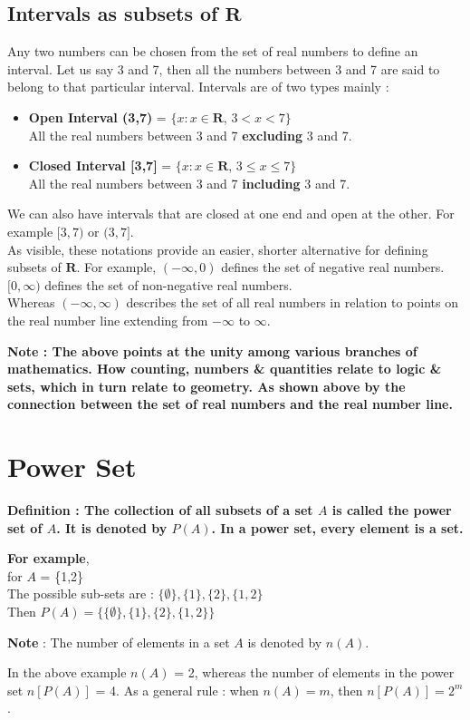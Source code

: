 \documentclass[12pt, letterpaper]{article}
\begin{document}
\subsection{Intervals as subsets of $\mathbf{R}$}
Any two numbers can be chosen from the set of real numbers to define an interval. Let us say 3 and 7, then all the numbers between 3 and 7 are said to belong to that particular interval. Intervals are of two types mainly : 
\begin{itemize}
    \item \textbf{Open Interval (3,7)} = $\{ x : x \in \mathbf{R}$, $3 < x < 7 \}$ \\
    All the real numbers between 3 and 7 \textbf{excluding} 3 and 7.
    \item \textbf{Closed Interval [3,7]} = $\{ x : x \in \mathbf{R}$, $3 \leq x \leq 7 \}$ \\
    All the real numbers between 3 and 7 \textbf{including} 3 and 7.
\end{itemize}
We can also have intervals that are closed at one end and open at the other. For example $[3,7)$ or $(3,7]$.\\
As visible, these notations provide an easier, shorter alternative for defining subsets of $\mathbf{R}$. For example, $(-\infty,0)$ defines the set of negative real numbers. $[0,\infty)$ defines the set of non-negative real numbers.\\
Whereas $(-\infty,\infty)$ describes the set of all real numbers in relation to points on the real number line extending from $-\infty$ to $\infty$.
\begin{displayquote}
\textbf{Note : The above points at the unity among various branches of mathematics. How counting, numbers \& quantities relate to logic \& sets, which in turn relate to geometry. As shown above by the connection between the set of real numbers and the real number line.}
\end{displayquote}


\section{Power Set}
\begin{displayquote}
\textbf{Definition : The collection of all subsets of a set $A$ is called the power set of $A$. It is denoted by $P(A)$. In a power set, every element is a set.}
\end{displayquote}
\textbf{For example},\\ 
for $A$ = \{1,2\}\\
The possible sub-sets are : $\{\emptyset\}, \{1\}, \{2\}, \{1,2\}$ \\ 
Then $P(A) = \{\{\emptyset\}, \{1\}, \{2\}, \{1,2\}\}$
\begin{displayquote}
\textbf{Note} : The number of elements in a set $A$ is denoted by $n(A)$.
\end{displayquote}
In the above example $n(A)$ = 2, whereas the number of elements in the power set $n[P(A)]$ = 4. As a general rule : when $n(A) = m$, then $n[P(A)] = 2^m$. 
\end{document}
